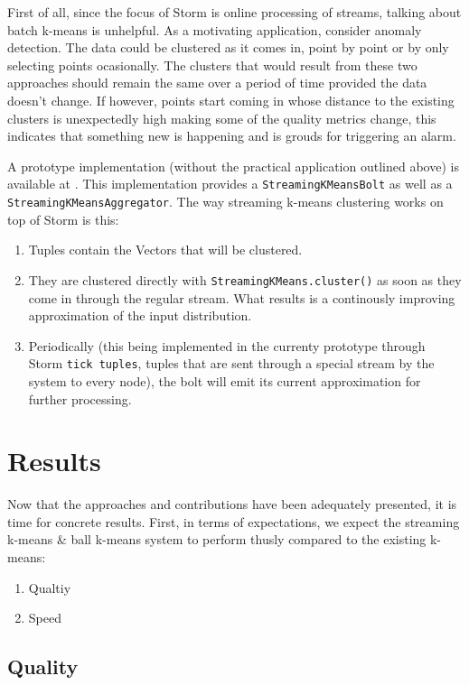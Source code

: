 \documentclass{article}
\begin{document}
First of all, since the focus of Storm is online processing of streams, talking
about batch k-means is unhelpful. As a motivating application, consider anomaly
detection. The data could be clustered as it comes in, point by point or by
only selecting points ocasionally. The clusters that would result from these
two approaches should remain the same over a period of time provided the data
doesn't change. If however, points start coming in whose distance to the
existing clusters is unexpectedly high making some of the quality metrics
change, this indicates that something new is happening and is grouds for
triggering an alarm.

A prototype implementation (without the practical application outlined above)
is available at \cite{ss}. This implementation provides a
\texttt{StreamingKMeansBolt} as well as a \texttt{StreamingKMeansAggregator}.
The way streaming k-means clustering works on top of Storm is this:
\begin{enumerate}
    \item Tuples contain the Vectors that will be clustered.
    \item They are clustered directly with \texttt{StreamingKMeans.cluster()}
        as soon as they come in through the regular stream. What results is a
        continously improving approximation of the input distribution.
    \item Periodically (this being implemented in the currenty prototype
        through Storm \texttt{tick tuples}, tuples that are sent through a
        special stream by the system to every node), the bolt will emit its
        current approximation for further processing.
\end{enumerate}

\section{Results}

Now that the approaches and contributions have been adequately presented, it is
time for concrete results. First, in terms of expectations, we expect the
streaming k-means \& ball k-means system to perform thusly compared to the
existing k-means:
\begin{enumerate}
    \item Qualtiy
    \item Speed
\end{enumerate}

\subsection{Quality}
\end{document}
